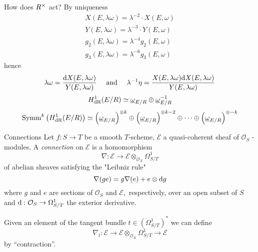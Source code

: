 \begin{frame}{How does $R^{\times}$ act?}
    By uniqueness
    \begin{equation*}
        \begin{array}{l}
            {X}\left({E}, \lambda{\omega}\right)=\lambda^{-2} \cdot {X}({E}, \omega) \\
            {Y}({E}, \lambda \omega)=\lambda^{-3} \cdot {Y}({E}, \omega) \\
            {g}_{2}({E}, \lambda \omega)=\lambda^{-4} {g}_{2}({E}, \omega) \\
            {g}_{3}({E}, \lambda \omega)=\lambda^{-6} {g}_{3}({E}, \omega)
        \end{array}
    \end{equation*}\pause
    hence
    \begin{equation*}
        \lambda \omega=\frac{\mathop{}\!\mathrm{d} {X}({E}, \lambda \omega)}{{Y}({E}, \lambda \omega)} \quad \text { and } \quad \lambda^{-1} \eta=\frac{{X}({E}, \lambda \omega) {\mathop{}\!\mathrm{d}} {X}({E}, \lambda \omega)}{{Y}({E}, \lambda \omega)}
    \end{equation*}
    \begin{equation*}
        {H}_{\mathrm{dR}}^1{({E} / {R})} \simeq \underline{\omega}_{{E} / {R}} \oplus \underline{\omega}_{{E} / {R}}^{-1}
    \end{equation*}
    \begin{equation*}
        \text{Symm}^{{k}}\left({H}_{{\mathrm{dR}}}^{1}({E} / {R})\right) \simeq\left(\underline{\omega}_{{E} / {R}}\right)^{\otimes {k}} \oplus\left(\underline{\omega}_{{E} / {R}}\right)^{\otimes {k}-2} \oplus \cdots \oplus\left(\underline{\omega}_{{E} / {R}}\right)^{\otimes-{k}}
    \end{equation*}
\end{frame}

\begin{frame}{Connections}
    Let $f: S \rightarrow T$ be a smooth $T$-scheme, $\mathcal{E}$ a quasi-coherent sheaf of $\mathcal{O}_{S}$ -modules.
    A \emph{connection} on $\mathcal{E}$ is a homomorphism
    $$
    \nabla: \mathcal{E} \rightarrow \mathcal{E} \otimes_{\mathcal{O}_{X}} \Omega_{S / T}^{1}
    $$
    of abelian sheaves satisfying the "Leibniz rule"
    $$
    \nabla(g e)=g \nabla(e)+e\otimes\mathop{}\!\mathrm{d} g 
    $$
    where $g$ and $e$ are sections of $\mathcal{O}_{S}$ and $\mathcal{E},$ respectively, over an open subset of $S$ and $\mathop{}\!\mathrm{d} : \mathcal{O}_{S} \rightarrow \Omega_{S / T}^{1}$ the exterior derivative.\pause

    Given an element of the tangent bundle $t \in (\Omega_{S/T}^1)^*$ we can define
    \[
        \nabla_t \colon \mathcal E \to \mathcal{E} \otimes_{\mathcal{O}_{X}} \Omega_{S / T}^{1}\to \mathcal E
    \]
    by ``contraction''.


\end{frame}

